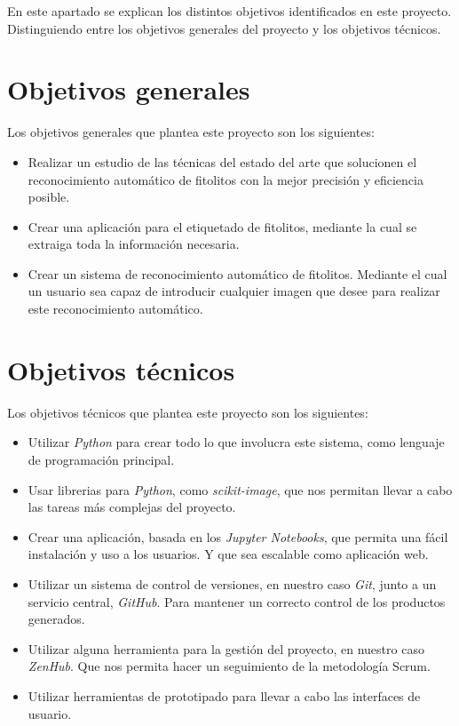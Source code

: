 

En este apartado se explican los distintos objetivos identificados en este proyecto. Distinguiendo entre los objetivos generales del proyecto y los objetivos técnicos.

\section{Objetivos generales}

Los objetivos generales que plantea este proyecto son los siguientes:

\begin{itemize}
	\item Realizar un estudio de las técnicas del estado del arte que solucionen el reconocimiento automático de fitolitos con la mejor precisión y eficiencia posible.
	\item Crear una aplicación para el etiquetado de fitolitos, mediante la cual se extraiga toda la información necesaria.
	\item Crear un sistema de reconocimiento automático de fitolitos. Mediante el cual un usuario sea capaz de introducir cualquier imagen que desee para realizar este reconocimiento automático.
\end{itemize}

\section{Objetivos técnicos}

Los objetivos técnicos que plantea este proyecto son los siguientes:

\begin{itemize}
	\item Utilizar \textit{Python} para crear todo lo que involucra este sistema, como lenguaje de programación principal.
	\item Usar librerias para \textit{Python}, como \textit{scikit-image}\cite{scikit-image}, que nos permitan llevar a cabo las tareas más complejas del proyecto.
	\item Crear una aplicación, basada en los \textit{Jupyter Notebooks}, que permita una fácil instalación y uso a los usuarios. Y que sea escalable como aplicación web.
	\item Utilizar un sistema de control de versiones, en nuestro caso \textit{Git}, junto a un servicio central, \textit{GitHub}. Para mantener un correcto control de los productos generados.
	\item Utilizar alguna herramienta para la gestión del proyecto, en nuestro caso \textit{ZenHub}. Que nos permita hacer un seguimiento de la metodología Scrum.
	\item Utilizar herramientas de prototipado para llevar a cabo las interfaces de usuario.
\end{itemize}
